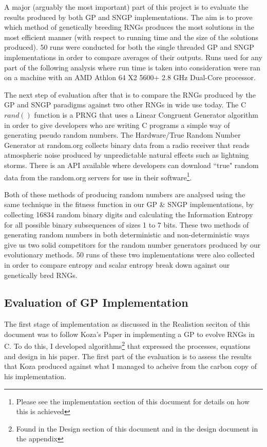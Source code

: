 \documentclass[a4paper,10.5pt]{article}
\begin{document}
A major (arguably the most important) part of this project is to evaluate the results produced by both GP and SNGP implementations. The aim is to prove which method of genetically breeding RNGs produces the most solutions in the most efficient manner (with respect to running time and the size of the solutions produced). 50 runs were conducted for both the single threaded GP and SNGP implementations in order to compare averages of their outputs. Runs used for any part of the following analysis where run time is taken into consideration were ran on a machine with an AMD Athlon 64 X2 5600+ 2.8 GHz Dual-Core processor.

The next step of evaluation after that is to compare the RNGs produced by the GP and SNGP paradigms against two other RNGs in wide use today. The C $rand()$ function is a PRNG that uses a Linear Congruent Generator algorithm in order to give developers who are writing C programs a simple way of generating pseudo random numbers. The Hardware/True Random Number Generator at random.org collects binary data from a radio receiver that reads atmospheric noise produced by unpredictable natural effects such as lightning storms. There is an API available where developers can download ``true" random data from the random.org servers for use in their software\footnote{Please see the implementation section of this document for details on how this is achieved}. 

Both of these methods of producing random numbers are analysed using the same technique in the fitness function in our GP \& SNGP implementations, by collecting 16834 random binary digits and calculating the Information Entropy for all possible binary subsequences of sizes 1 to 7 bits. These two methods of generating random numbers in both deterministic and non-deterministic ways give us two solid competitors for the random number generators produced by our evolutionary methods. 50 runs of these two implementations were also collected in order to compare entropy and scalar entropy break down against our genetically bred RNGs.

\subsection{Evaluation of GP Implementation}

The first stage of implementation as discussed in the Realistion seciton of this document was to follow Koza's Paper \cite{kozarng} in implementing a GP to evolve RNGs in C. To do this, I developed algorithms\footnote{Found in the Design section of this document and in the design document in the appendix} that expressed the processes, equations and design in his paper. The first part of the evaluation is to assess the results that Koza produced against what I managed to acheive from the carbon copy of his implementation.
\end{document}
